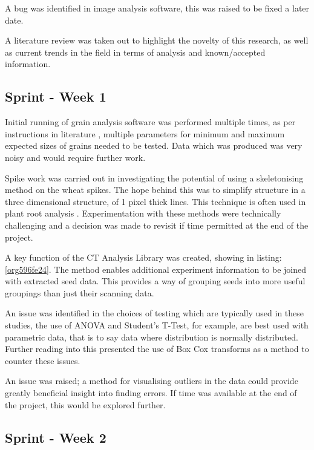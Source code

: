 \documentclass[11pt]{report}
\begin{document}
A bug was identified in image analysis software, this was raised to be fixed a later date.

A literature review was taken out to highlight the novelty of this research, as well as current trends in the field in terms of analysis and known/accepted information.

\subsection{Sprint - Week 1}
\label{sec:org2b7cd7d}

Initial running of grain analysis software was performed multiple times, as per instructions in literature \cite{Hughes2017}, multiple parameters for minimum and maximum expected sizes of grains needed to be tested. Data which was produced was very noisy and would require further work.

Spike work was carried out in investigating the potential of using a skeletonising method on the wheat spikes. The hope behind this was to simplify structure in a three dimensional structure, of 1 pixel thick lines. This technique is often used in plant root analysis \cite{Mairhofer2015,Daly2017}. Experimentation with these methods were technically challenging and a decision was made to revisit if time permitted at the end of the project.

A key function of the CT Analysis Library was created, showing in listing:\ref{org596fe24}. The method enables additional experiment information to be joined with extracted seed data. This provides a way of grouping seeds into more useful groupings than just their scanning data.

An issue was identified in the choices of testing which are typically used in these studies, the use of ANOVA and Student's T-Test, for example, are best used with parametric data, that is to say data where distribution is normally distributed. Further reading into this presented the use of Box Cox transforms as a method to counter these issues.

An issue was raised; a method for visualising outliers in the data could provide greatly beneficial insight into finding errors. If time was available at the end of the project, this would be explored further.

\subsection{Sprint - Week 2}
\label{sec:org28f2acc}
\end{document}

